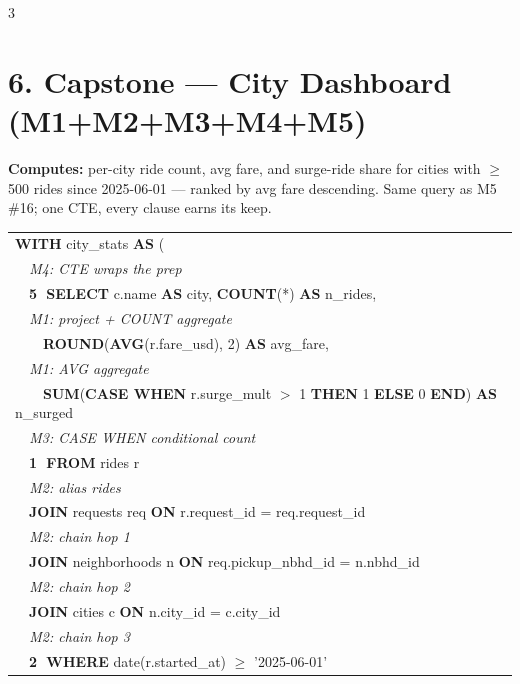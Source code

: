 \documentclass[landscape,letterpaper,9pt]{extarticle}
\begin{document}
\begin{multicols*}{3}
\section*{6. Capstone — City Dashboard (M1+M2+M3+M4+M5)}
\textcolor{cmt}{\scriptsize \textbf{Computes:} per-city ride count, avg fare, and surge-ride share for cities with $\geq$500 rides since 2025-06-01 — ranked by avg fare descending. Same query as M5 \#16; one CTE, every clause earns its keep.}\\[1pt]
\colorbox{black!4}{%
\begin{minipage}{\dimexpr\linewidth-2pt}
{\ttfamily\scriptsize
\begin{tabular}{@{}l@{}}
\textbf{WITH} city\_stats \textbf{AS} ( \\
\textcolor{cmt}{\itshape ~~M4: CTE wraps the prep} \\
\textcolor{stepSelect}{~~\textbf{\textcircled{\scriptsize 5} SELECT} c.name \textbf{AS} city, \textbf{COUNT}(*) \textbf{AS} n\_rides,} \\
\textcolor{cmt}{\itshape ~~M1: project + COUNT aggregate} \\
\textcolor{stepSelect}{~~~~\textbf{ROUND}(\textbf{AVG}(r.fare\_usd), 2) \textbf{AS} avg\_fare,} \\
\textcolor{cmt}{\itshape ~~M1: AVG aggregate} \\
\textcolor{stepSelect}{~~~~\textbf{SUM}(\textbf{CASE WHEN} r.surge\_mult $>$ 1 \textbf{THEN} 1 \textbf{ELSE} 0 \textbf{END}) \textbf{AS} n\_surged} \\
\textcolor{cmt}{\itshape ~~M3: CASE WHEN conditional count} \\
\textcolor{stepFrom}{~~\textbf{\textcircled{\scriptsize 1} FROM} rides r} \\
\textcolor{cmt}{\itshape ~~M2: alias rides} \\
\textcolor{stepFrom}{~~\textbf{JOIN} requests req \textbf{ON} r.request\_id = req.request\_id} \\
\textcolor{cmt}{\itshape ~~M2: chain hop 1} \\
\textcolor{stepFrom}{~~\textbf{JOIN} neighborhoods n \textbf{ON} req.pickup\_nbhd\_id = n.nbhd\_id} \\
\textcolor{cmt}{\itshape ~~M2: chain hop 2} \\
\textcolor{stepFrom}{~~\textbf{JOIN} cities c \textbf{ON} n.city\_id = c.city\_id} \\
\textcolor{cmt}{\itshape ~~M2: chain hop 3} \\
\textcolor{stepWhere}{~~\textbf{\textcircled{\scriptsize 2} WHERE} date(r.started\_at) $\geq$ '2025-06-01'} \\

\end{tabular}}
\end{minipage}}
\end{multicols*}
\end{document}
